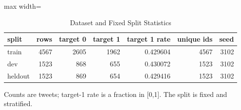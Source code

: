 \begin{table}[t]
\centering
\caption{Dataset and Fixed Split Statistics}
\label{tab:dataset_split}
\begin{adjustbox}{max width=\textwidth}
\scriptsize
\begin{tabular}{lrrrrrr}
\hline
split & rows & target 0 & target 1 & target 1 rate & unique ids & seed \\
\hline
train & 4567 & 2605 & 1962 & 0.429604 & 4567 & 3102 \\
dev & 1523 & 868 & 655 & 0.430072 & 1523 & 3102 \\
heldout & 1523 & 869 & 654 & 0.429416 & 1523 & 3102 \\
\hline
\end{tabular}
\end{adjustbox}
\par\footnotesize{Counts are tweets; target-1 rate is a fraction in [0,1]. The split is fixed and stratified.}
\end{table}

